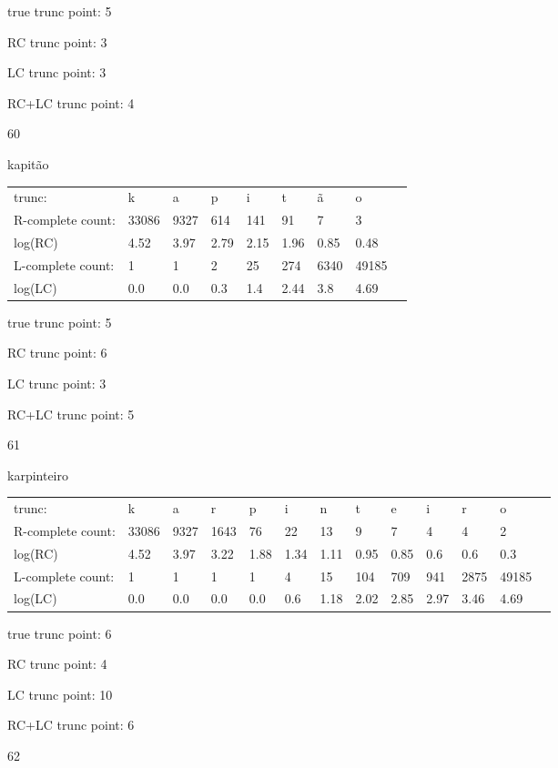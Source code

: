 \documentclass{article}
\begin{document}
true trunc point: 5

RC trunc point: 3

LC trunc point: 3

RC+LC trunc point: 4

\vspace{1em}

60

kapitão

\begin{tabular}{l|llllllll}
trunc: & k & a & p & i & t & ã & o & \\ 
R-complete count: & 33086 & 9327 & 614 & 141 & 91 & 7 & 3 & \\ 
log(RC) & 4.52 & 3.97 & 2.79 & 2.15 & 1.96 & 0.85 & 0.48 & \\ 
L-complete count: & 1 & 1 & 2 & 25 & 274 & 6340 & 49185 & \\ 
log(LC) & 0.0 & 0.0 & 0.3 & 1.4 & 2.44 & 3.8 & 4.69 & \\ 
\end{tabular}

true trunc point: 5

RC trunc point: 6

LC trunc point: 3

RC+LC trunc point: 5

\newpage

61

karpinteiro

\begin{tabular}{l|llllllllllll}
trunc: & k & a & r & p & i & n & t & e & i & r & o & \\ 
R-complete count: & 33086 & 9327 & 1643 & 76 & 22 & 13 & 9 & 7 & 4 & 4 & 2 & \\ 
log(RC) & 4.52 & 3.97 & 3.22 & 1.88 & 1.34 & 1.11 & 0.95 & 0.85 & 0.6 & 0.6 & 0.3 & \\ 
L-complete count: & 1 & 1 & 1 & 1 & 4 & 15 & 104 & 709 & 941 & 2875 & 49185 & \\ 
log(LC) & 0.0 & 0.0 & 0.0 & 0.0 & 0.6 & 1.18 & 2.02 & 2.85 & 2.97 & 3.46 & 4.69 & \\ 
\end{tabular}

true trunc point: 6

RC trunc point: 4

LC trunc point: 10

RC+LC trunc point: 6

\vspace{1em}

62
\end{document}
